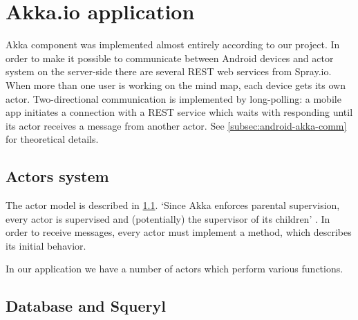 %
%
%
%
%

\section{Akka.io application}
\label{sec:akka-app}
Akka component was implemented almost entirely according to our project. In order to make it possible to communicate between Android devices and actor system on the server-side there are several REST web services from Spray.io. When more than one user is working on the mind map, each device gets its own actor.  Two-directional communication is implemented by long-polling: a mobile app initiates a connection with a REST service which waits with responding until its actor receives a message from another actor. See \cref{subsec:android-akka-comm} for theoretical details.  

\subsection{Actors system }
\label{subsection:akka-actors}
The actor model is described in \cref{subsection:akka-actors}. `Since Akka enforces parental supervision, every actor is supervised and (potentially) the supervisor of its children' \cite{AkkaDoc:2013:Actors}. In order to receive messages, every actor must implement a  method, which describes its initial behavior.

In our application we have a number of actors which perform various functions.


\subsection{Database and Squeryl}
\label{subsection:akka-database}


